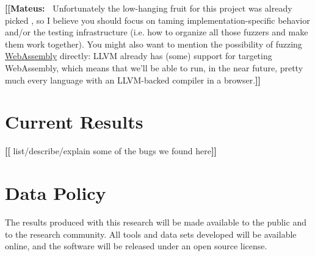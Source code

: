 \documentclass[11pt]{article}
\newcommand{\Fix}[1]{\textbf{[[}{\color{red} #1}\textbf{]]}}
\newcommand{\Mar}[1]{\textbf{[[Marcelo:~}{\color{blue} #1}\textbf{]]}}
\newcommand{\MAB}[1]{\textbf{[[Mateus:~}{\color{darkgreen} #1}\textbf{]]}}
\begin{document}

\MAB{Unfortunately the low-hanging fruit for this project was already
  picked \cite{patra2016learning}, so I believe you should focus on
  taming implementation-specific behavior and/or the testing
  infrastructure (i.e. how to organize all those fuzzers and make them
  work together). You might also want to mention the possibility of
  fuzzing
  \href{https://developer.mozilla.org/en-US/docs/WebAssembly}{WebAssembly}
  directly: LLVM already has (some) support for targeting WebAssembly,
  which means that we'll be able to run, in the near future, pretty
  much every language with an LLVM-backed compiler in a browser.}

\section{Current Results}
\label{sec:results}

\Fix{list/describe/explain some of the bugs we found here}

\section{Data Policy}

The results produced with this research will be made available to the
public and to the research community.  All tools and data sets
developed will be available online, and the software will be released
under an open source license.


\footnotesize


\end{document}
